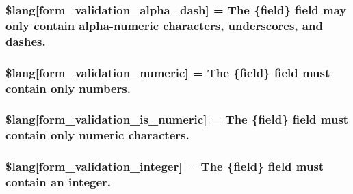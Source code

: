 \subsubsection[{\$lang}]{\setlength{\rightskip}{0pt plus 5cm}\$lang\mbox{[}\textquotesingle{}form\+\_\+validation\+\_\+alpha\+\_\+dash\textquotesingle{}\mbox{]} = \textquotesingle{}The \{field\} field may only contain alpha-\/numeric characters, underscores, and dashes.\textquotesingle{}}\label{form__validation__lang_8php_a95a401451435c56b9792be96ffa1bb36}
\hypertarget{form__validation__lang_8php_abfd87d5b6c986ce3d4c0498ade54b380}{}
\subsubsection[{\$lang}]{\setlength{\rightskip}{0pt plus 5cm}\$lang\mbox{[}\textquotesingle{}form\+\_\+validation\+\_\+numeric\textquotesingle{}\mbox{]} = \textquotesingle{}The \{field\} field must contain only numbers.\textquotesingle{}}\label{form__validation__lang_8php_abfd87d5b6c986ce3d4c0498ade54b380}
\hypertarget{form__validation__lang_8php_a520425fb2cba1854c9df71d98f5645c3}{}
\subsubsection[{\$lang}]{\setlength{\rightskip}{0pt plus 5cm}\$lang\mbox{[}\textquotesingle{}form\+\_\+validation\+\_\+is\+\_\+numeric\textquotesingle{}\mbox{]} = \textquotesingle{}The \{field\} field must contain only numeric characters.\textquotesingle{}}\label{form__validation__lang_8php_a520425fb2cba1854c9df71d98f5645c3}
\hypertarget{form__validation__lang_8php_a4253ed0257e1c783da5b45a932b473ba}{}
\subsubsection[{\$lang}]{\setlength{\rightskip}{0pt plus 5cm}\$lang\mbox{[}\textquotesingle{}form\+\_\+validation\+\_\+integer\textquotesingle{}\mbox{]} = \textquotesingle{}The \{field\} field must contain an integer.\textquotesingle{}}\label{form__validation__lang_8php_a4253ed0257e1c783da5b45a932b473ba}
\hypertarget{form__validation__lang_8php_a3642194a4f8f60f9588a66d6b2096755}{}
